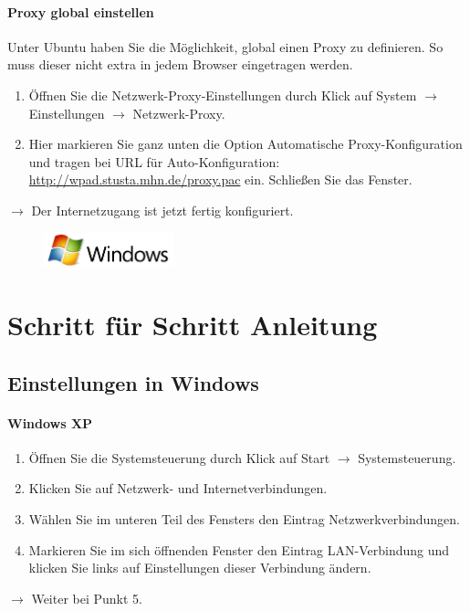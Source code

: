 \documentclass[a4paper,12pt]{scrartcl}
\begin{document}
\paragraph*{Proxy global einstellen}
Unter Ubuntu haben Sie die Möglichkeit, global einen Proxy zu definieren. So muss dieser nicht extra in jedem Browser eingetragen werden.
\begin{enumerate}
    \item Öffnen Sie die Netzwerk-Proxy-Einstellungen durch Klick auf System $\rightarrow$ Einstellungen $\rightarrow$ Netzwerk-Proxy.
    \item Hier markieren Sie ganz unten die Option Automatische Proxy-Konfiguration und tragen bei URL für Auto-Konfiguration: \url{http://wpad.stusta.mhn.de/proxy.pac} ein. Schließen Sie das Fenster. 
\end{enumerate}
$\rightarrow$ Der Internetzugang ist jetzt fertig konfiguriert.



\newpage
\enlargethispage{20pt}

\begin{figure}[t!]
    \raggedleft
    \vspace{-20pt}
    \includegraphics[height=1cm,keepaspectratio]{Bilder/Windows_logo}
    \vspace{-30pt}
\end{figure}

\section*{Schritt für Schritt Anleitung}
\subsection*{Einstellungen in Windows}
\paragraph*{Windows XP}
\begin{enumerate}
     \item Öffnen Sie die Systemsteuerung durch Klick auf Start $\rightarrow$ Systemsteuerung.
     \item Klicken Sie auf Netzwerk- und Internetverbindungen.
     \item Wählen Sie im unteren Teil des Fensters den Eintrag Netzwerkverbindungen. 
     \item Markieren Sie im sich öffnenden Fenster den Eintrag LAN-Verbindung und klicken Sie links auf Einstellungen dieser Verbindung ändern.
\end{enumerate}
$\rightarrow$ Weiter bei Punkt 5.
\end{document}
